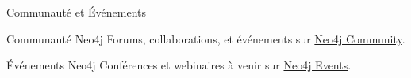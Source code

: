 \begin{frame}{Communauté et Événements}
  \begin{block}{Communauté Neo4j}
     Forums, collaborations, et événements sur \href{https://community.neo4j.com/}{Neo4j Community}.
  \end{block}

  \begin{block}{Événements Neo4j}
       Conférences et webinaires à venir sur \href{https://neo4j.com/events/}{Neo4j Events}.
  \end{block}
\end{frame}